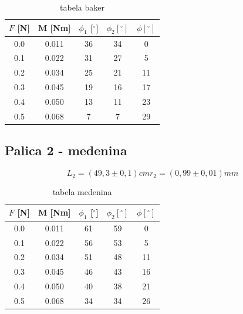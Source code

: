 \documentclass[11pt]{article}
\begin{document}
    \begin{table}[H]
        \centering
        \begin{tabular}{|c|c|c|c|c|}
            \hline
            $F$ [N] & M [Nm] & $\phi_1$ [$^\circ$] & $\phi_2 [^\circ]$ & $  \phi [^\circ]$\\
            \hline
            0.0  & 0.011 & 36  & 34  & 0 \\
            0.1  & 0.022 & 31  & 27  & 5 \\
            0.2  & 0.034 & 25  & 21  & 11 \\
            0.3  & 0.045 & 19  & 16  & 17 \\
            0.4  & 0.050 & 13  & 11  & 23 \\
            0.5  & 0.068 & 7   &  7  & 29 \\
            \hline
        \end{tabular}
        \caption{tabela baker}
        \label{tab:baker}
    \end{table}

    \subsection{Palica 2 - medenina}
    \[
        L_2 = (49,3 \pm 0,1) cm
        r_2 = (0,99 \pm 0,01) mm
    \]
    \begin{table}[H]
        \centering
        \begin{tabular}{|c|c|c|c|c|}
            \hline
            $F$ [N] & M [Nm] & $\phi_1$ [$^\circ$] & $\phi_2 [^\circ]$ & $  \phi [^\circ]$\\
            \hline
            0.0  & 0.011 & 61  & 59  & 0 \\
            0.1  & 0.022 & 56  & 53  & 5 \\
            0.2  & 0.034 & 51  & 48  & 11 \\
            0.3  & 0.045 & 46  & 43  & 16 \\
            0.4  & 0.050 & 40  & 38  & 21 \\
            0.5  & 0.068 & 34  & 34  & 26 \\
            \hline
        \end{tabular}
        \caption{tabela medenina}
        \label{tab:medenina}
    \end{table}
\end{document}
